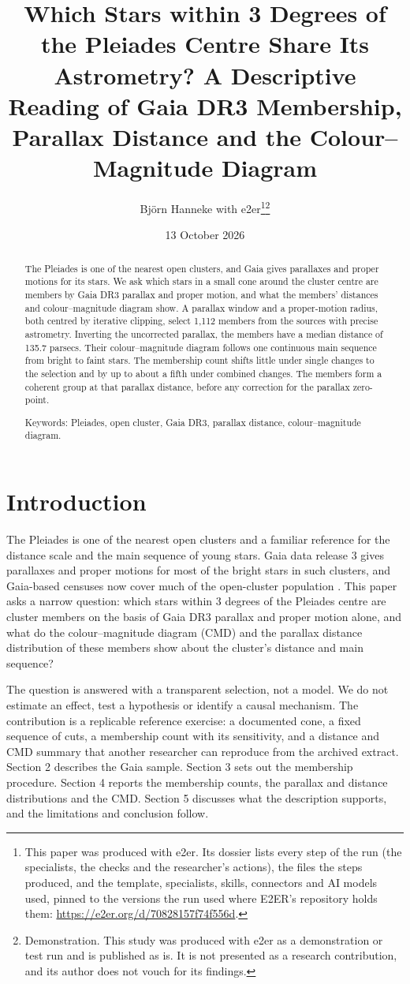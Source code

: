 \documentclass[11pt]{article}
\title{Which Stars within 3 Degrees of the Pleiades Centre Share Its Astrometry? A Descriptive Reading of Gaia DR3 Membership, Parallax Distance and the Colour--Magnitude Diagram}
\author{Björn Hanneke with e2er\thanks{This paper was produced with e2er. Its dossier lists every step of the run (the specialists, the checks and the researcher's actions), the files the steps produced, and the template, specialists, skills, connectors and AI models used, pinned to the versions the run used where E2ER's repository holds them: \url{https://e2er.org/d/70828157f74f556d}.}\thanks{Demonstration. This study was produced with e2er as a demonstration or test run and is published as is. It is not presented as a research contribution, and its author does not vouch for its findings.}}
\date{13 October 2026}
\begin{document}
\maketitle

\begin{abstract}
The Pleiades is one of the nearest open clusters, and Gaia gives parallaxes and proper motions for its stars. We ask which stars in a small cone around the cluster centre are members by Gaia DR3 parallax and proper motion, and what the members' distances and colour--magnitude diagram show. A parallax window and a proper-motion radius, both centred by iterative clipping, select 1,112 members from the sources with precise astrometry.
Inverting the uncorrected parallax, the members have a median distance of 135.7 parsecs.
Their colour--magnitude diagram follows one continuous main sequence from bright to faint stars. The membership count shifts little under single changes to the selection and by up to about a fifth under combined changes. The members form a coherent group at that parallax distance, before any correction for the parallax zero-point.

Keywords: Pleiades, open cluster, Gaia DR3, parallax distance, colour--magnitude diagram.
\end{abstract}

\section{Introduction}

The Pleiades is one of the nearest open clusters and a familiar reference for the distance scale and the main sequence of young stars. Gaia data release 3 \citep{GaiaMission_Prusti2016,GaiaDR3_Vallenari2023} gives parallaxes and proper motions for most of the bright stars in such clusters, and Gaia-based censuses now cover much of the open-cluster population \citep{cantatgaudin2022milky,cantatgaudin2024how}. This paper asks a narrow question: which stars within 3 degrees of the Pleiades centre are cluster members on the basis of Gaia DR3 parallax and proper motion alone, and what do the colour--magnitude diagram (CMD) and the parallax distance distribution of these members show about the cluster's distance and main sequence?

The question is answered with a transparent selection, not a model. We do not estimate an effect, test a hypothesis or identify a causal mechanism. The contribution is a replicable reference exercise: a documented cone, a fixed sequence of cuts, a membership count with its sensitivity, and a distance and CMD summary that another researcher can reproduce from the archived extract. Section 2 describes the Gaia sample. Section 3 sets out the membership procedure. Section 4 reports the membership counts, the parallax and distance distributions and the CMD. Section 5 discusses what the description supports, and the limitations and conclusion follow.
\end{document}

